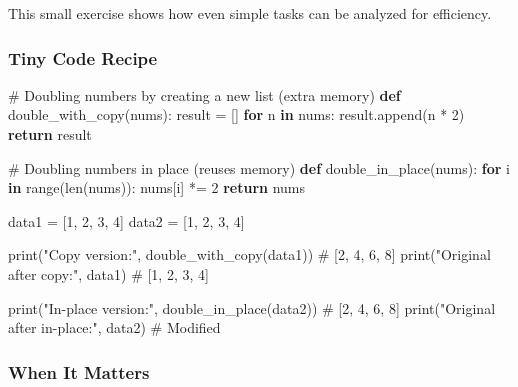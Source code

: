 \documentclass[
  letterpaper,
  DIV=11,
  numbers=noendperiod]{scrreprt}
\newenvironment{Shaded}{\begin{snugshade}}{\end{snugshade}}
\newcommand{\BuiltInTok}[1]{\textcolor[rgb]{0.00,0.23,0.31}{#1}}
\newcommand{\CommentTok}[1]{\textcolor[rgb]{0.37,0.37,0.37}{#1}}
\newcommand{\ControlFlowTok}[1]{\textcolor[rgb]{0.00,0.23,0.31}{\textbf{#1}}}
\newcommand{\DecValTok}[1]{\textcolor[rgb]{0.68,0.00,0.00}{#1}}
\newcommand{\KeywordTok}[1]{\textcolor[rgb]{0.00,0.23,0.31}{\textbf{#1}}}
\newcommand{\NormalTok}[1]{\textcolor[rgb]{0.00,0.23,0.31}{#1}}
\newcommand{\OperatorTok}[1]{\textcolor[rgb]{0.37,0.37,0.37}{#1}}
\newcommand{\StringTok}[1]{\textcolor[rgb]{0.13,0.47,0.30}{#1}}
\begin{document}
This small exercise shows how even simple tasks can be analyzed for
efficiency.

\subsubsection{Tiny Code Recipe}\label{tiny-code-recipe-78}

\begin{Shaded}
\begin{Highlighting}[]
\CommentTok{\# Doubling numbers by creating a new list (extra memory)}
\KeywordTok{def}\NormalTok{ double\_with\_copy(nums):}
\NormalTok{    result }\OperatorTok{=}\NormalTok{ []}
    \ControlFlowTok{for}\NormalTok{ n }\KeywordTok{in}\NormalTok{ nums:}
\NormalTok{        result.append(n }\OperatorTok{*} \DecValTok{2}\NormalTok{)}
    \ControlFlowTok{return}\NormalTok{ result}

\CommentTok{\# Doubling numbers in place (reuses memory)}
\KeywordTok{def}\NormalTok{ double\_in\_place(nums):}
    \ControlFlowTok{for}\NormalTok{ i }\KeywordTok{in} \BuiltInTok{range}\NormalTok{(}\BuiltInTok{len}\NormalTok{(nums)):}
\NormalTok{        nums[i] }\OperatorTok{*=} \DecValTok{2}
    \ControlFlowTok{return}\NormalTok{ nums}

\NormalTok{data1 }\OperatorTok{=}\NormalTok{ [}\DecValTok{1}\NormalTok{, }\DecValTok{2}\NormalTok{, }\DecValTok{3}\NormalTok{, }\DecValTok{4}\NormalTok{]}
\NormalTok{data2 }\OperatorTok{=}\NormalTok{ [}\DecValTok{1}\NormalTok{, }\DecValTok{2}\NormalTok{, }\DecValTok{3}\NormalTok{, }\DecValTok{4}\NormalTok{]}

\BuiltInTok{print}\NormalTok{(}\StringTok{"Copy version:"}\NormalTok{, double\_with\_copy(data1))   }\CommentTok{\# [2, 4, 6, 8]}
\BuiltInTok{print}\NormalTok{(}\StringTok{"Original after copy:"}\NormalTok{, data1)              }\CommentTok{\# [1, 2, 3, 4]}

\BuiltInTok{print}\NormalTok{(}\StringTok{"In{-}place version:"}\NormalTok{, double\_in\_place(data2)) }\CommentTok{\# [2, 4, 6, 8]}
\BuiltInTok{print}\NormalTok{(}\StringTok{"Original after in{-}place:"}\NormalTok{, data2)           }\CommentTok{\# Modified}
\end{Highlighting}
\end{Shaded}

\subsubsection{When It Matters}\label{when-it-matters-78}
\end{document}
